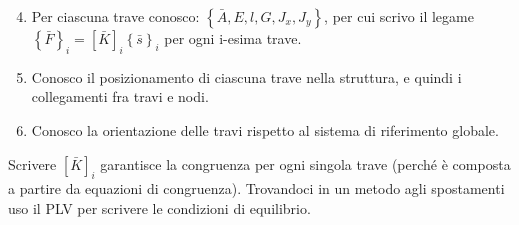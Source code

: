 \begin{enumerate}
 \setcounter{enumi}{3}
    \item Per ciascuna trave conosco: $\left\{\bar{A}, E, l ,G, J_x, J_y\right\}$, per cui scrivo il legame 
    $\left\{\bar{F}\right\}_i = [\bar{K}]_i\left\{\bar{s}\right\}_i$ per ogni i-esima trave.\\
    \item Conosco il posizionamento di ciascuna trave nella struttura, e quindi i collegamenti fra travi e nodi.\\
    \item Conosco la orientazione delle travi rispetto al sistema di riferimento globale.\\
\end{enumerate}

Scrivere $[\bar{K}]_i$ garantisce la congruenza per ogni singola trave (perché è composta a partire da equazioni di congruenza). Trovandoci in un metodo agli spostamenti uso il PLV per scrivere le condizioni di equilibrio.


